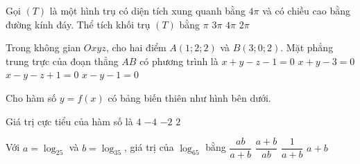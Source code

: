 \begin{ex}%
    Gọi $(T)$ là một hình trụ có diện tích xung quanh bằng $4\pi$ và có chiều cao bằng đường kính đáy. Thể tích khối trụ $(T)$ bằng
    \choice
    {$\pi$}
    {$3\pi$}
    {$4\pi$}
    {\True $2\pi$}
\end{ex}

\begin{ex}%
    Trong không gian $Oxyz$, cho hai điểm $A(1; 2; 2)$ và $B(3; 0; 2)$. Mặt phẳng trung trực của đoạn thẳng $AB$ có phương trình là
    \choice
    {$x+y-z-1=0$}
    {$x+y-3=0$}
    {$x-y-z+1=0$}
    {\True $x-y-1=0$}
\end{ex}

\begin{ex}%
    Cho hàm số $y=f(x)$ có bảng biến thiên như hình bên dưới.
    \begin{center}
    \end{center}
    Giá trị cực tiểu của hàm số là
    \choice
    {\True $4$}
    {$-4$}
    {$-2$}
    {$2$}
\end{ex}

\begin{ex}%
    Với $a=\log_25$ và $b=\log_35$, giá trị của $\log_65$ bằng
    \choice
    {\True $\dfrac{ab}{a+b}$}
    {$\dfrac{a+b}{ab}$}
    {$\dfrac{1}{a+b}$}
    {$a+b$}
\end{ex}

